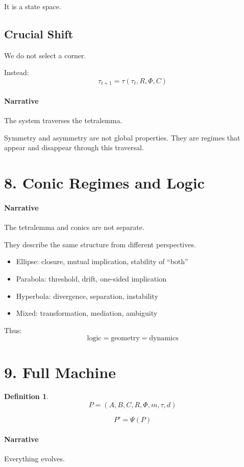 \documentclass[11pt]{article}
\newtheorem{definition}{Definition}
\begin{document}
It is a state space.

\subsection*{Crucial Shift}
We do not select a corner.

Instead:
\[
\tau_{t+1} = \tau(\tau_t, R, \Phi, C)
\]

\paragraph{Narrative}
The system traverses the tetralemma.

Symmetry and asymmetry are not global properties.
They are regimes that appear and disappear through this traversal.

\section{8. Conic Regimes and Logic}

\paragraph{Narrative}
The tetralemma and conics are not separate.

They describe the same structure from different perspectives.

\begin{itemize}
\item Ellipse: closure, mutual implication, stability of ``both''
\item Parabola: threshold, drift, one-sided implication
\item Hyperbola: divergence, separation, instability
\item Mixed: transformation, mediation, ambiguity
\end{itemize}

Thus:
\[
\text{logic} = \text{geometry} = \text{dynamics}
\]

\section{9. Full Machine}

\begin{definition}
\[
P = (A,B,C,R,\Phi,m,\tau,d)
\]
\end{definition}

\[
P' = \Psi(P)
\]

\paragraph{Narrative}
Everything evolves.
\end{document}
